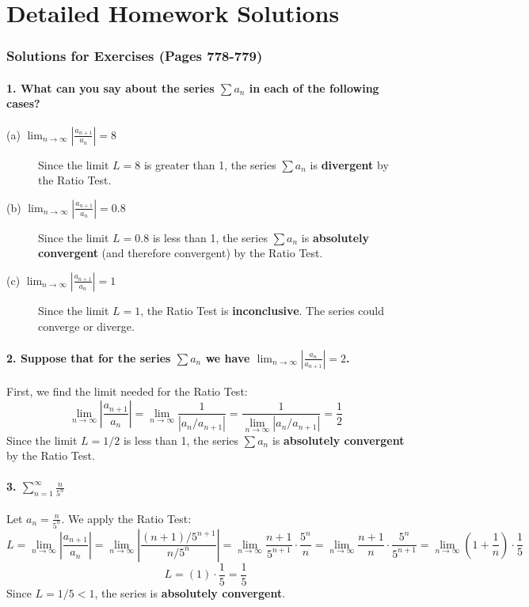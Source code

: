 \documentclass{article}
\begin{document}
\part{Detailed Homework Solutions}
\section{Solutions for Exercises (Pages 778-779)}

\subsection*{1. What can you say about the series $\sum a_n$ in each of the following cases?}
\begin{description}
    \item[(a) $\lim_{n \to \infty} |\frac{a_{n+1}}{a_n}| = 8$]
    Since the limit $L = 8$ is greater than 1, the series $\sum a_n$ is \textbf{divergent} by the Ratio Test.

    \item[(b) $\lim_{n \to \infty} |\frac{a_{n+1}}{a_n}| = 0.8$]
    Since the limit $L = 0.8$ is less than 1, the series $\sum a_n$ is \textbf{absolutely convergent} (and therefore convergent) by the Ratio Test.

    \item[(c) $\lim_{n \to \infty} |\frac{a_{n+1}}{a_n}| = 1$]
    Since the limit $L = 1$, the Ratio Test is \textbf{inconclusive}. The series could converge or diverge.
\end{description}

\subsection*{2. Suppose that for the series $\sum a_n$ we have $\lim_{n \to \infty} |\frac{a_n}{a_{n+1}}| = 2$.}
First, we find the limit needed for the Ratio Test:
\[ \lim_{n \to \infty} \left| \frac{a_{n+1}}{a_n} \right| = \lim_{n \to \infty} \frac{1}{|a_n/a_{n+1}|} = \frac{1}{\lim_{n \to \infty} |a_n/a_{n+1}|} = \frac{1}{2} \]
Since the limit $L = 1/2$ is less than 1, the series $\sum a_n$ is \textbf{absolutely convergent} by the Ratio Test.

\subsection*{3. $\sum_{n=1}^{\infty} \frac{n}{5^n}$}
Let $a_n = \frac{n}{5^n}$. We apply the Ratio Test:
\[ L = \lim_{n \to \infty} \left| \frac{a_{n+1}}{a_n} \right| = \lim_{n \to \infty} \left| \frac{(n+1)/5^{n+1}}{n/5^n} \right| = \lim_{n \to \infty} \frac{n+1}{5^{n+1}} \cdot \frac{5^n}{n} = \lim_{n \to \infty} \frac{n+1}{n} \cdot \frac{5^n}{5^{n+1}} = \lim_{n \to \infty} \left(1 + \frac{1}{n}\right) \cdot \frac{1}{5} \]
\[ L = (1) \cdot \frac{1}{5} = \frac{1}{5} \]
Since $L = 1/5 < 1$, the series is \textbf{absolutely convergent}.
\end{document}
